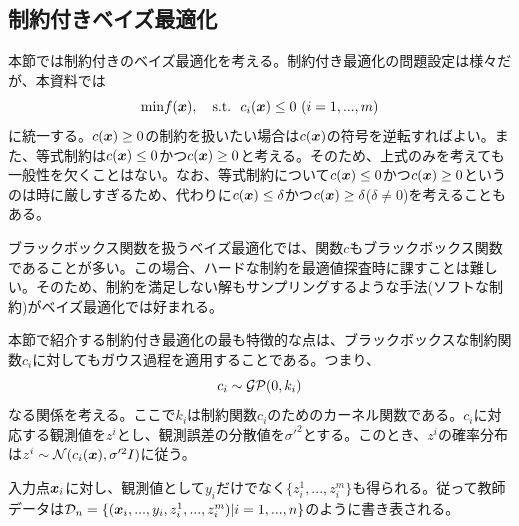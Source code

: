 \documentclass[dvipdfmx, 9pt, a4paper]{jsarticle}
\numberwithin{equation}{section}
\newcommand{\bm}[1]{{\mbox{\boldmath $#1$}}}
\begin{document}
\subsection{制約付きベイズ最適化}
本節では制約付きのベイズ最適化を考える。制約付き最適化の問題設定は様々だが、本資料では
\begin{equation}
{\rm min}f(\bm x),~~~{\rm s.t.}~~c_i(\bm x) \leq 0~(i=1,...,m)
\end{equation}
に統一する。$c(\bm x) \geq 0$の制約を扱いたい場合は$c(\bm x)$の符号を逆転すればよい。また、等式制約は$c(\bm x) \leq 0$かつ$c(\bm x) \geq 0$と考える。そのため、上式のみを考えても一般性を欠くことはない。なお、等式制約について$c(\bm x) \leq 0$かつ$c(\bm x) \geq 0$というのは時に厳しすぎるため、代わりに$c(\bm x) \leq \delta$かつ$c(\bm x) \geq \delta$($\delta \neq 0$)を考えることもある。\par
ブラックボックス関数を扱うベイズ最適化では、関数$c$もブラックボックス関数であることが多い。この場合、ハードな制約を最適値探査時に課すことは難しい。そのため、制約を満足しない解もサンプリングするような手法(ソフトな制約)がベイズ最適化では好まれる。\par
本節で紹介する制約付き最適化の最も特徴的な点は、ブラックボックスな制約関数$c_i$に対してもガウス過程を適用することである。つまり、
\begin{equation}
c_i \sim \mathcal{GP}(0, k_i) \notag
\end{equation}
なる関係を考える。ここで$k_i$は制約関数$c_i$のためのカーネル関数である。$c_i$に対応する観測値を$z^i$とし、観測誤差の分散値を$\sigma'^2$とする。このとき、$z^i$の確率分布は$z^i \sim \mathcal{N}(c_i(\bm x), \sigma'^2I)$に従う。\par
入力点$\bm x_i$に対し、観測値として$y_i$だけでなく$\{z_i^1, ..., z_i^m\}$も得られる。従って教師データは$\mathcal{D}_n=\{(\bm x_i, ..., y_i, z_i^1, ..., z_i^m)|i=1,...,n\}$のように書き表される。
\end{document}
